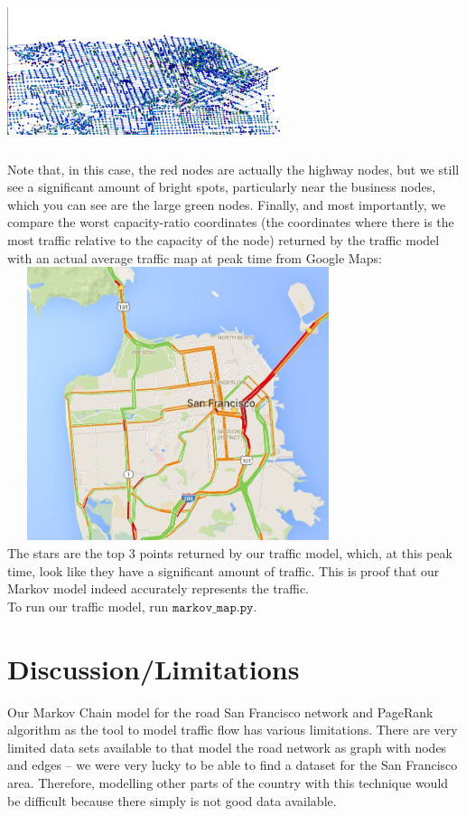 \documentclass{article}
\begin{document}
 \includegraphics[width=8cm,height=5cm]{../figs/f3} \\
Note that, in this case, the red nodes are actually the highway nodes, but we still see a significant amount of bright spots, particularly near the business nodes, which you can see are the large green nodes.
Finally, and most importantly, we compare the worst capacity-ratio coordinates (the coordinates where there is the most traffic relative to the capacity of the node) returned by the traffic model with an actual average traffic map at peak time from Google Maps: \\
 \includegraphics[width=10cm,height=8cm]{../figs/fkey} \\
 The stars are the top 3 points returned by our traffic model, which, at this peak time, look like they have a significant amount of traffic. This is proof that our Markov model indeed accurately represents the traffic. \\
 To run our traffic model, run $\texttt{markov\_map.py}$.
\section{Discussion/Limitations}
Our Markov Chain model for the road San Francisco network and PageRank algorithm as the tool to model traffic flow has various limitations. There are very limited data sets available to that model the road network as graph with nodes and edges – we were very lucky to be able to find a dataset for the San Francisco area.  Therefore, modelling other parts of the country with this technique would be difficult because there simply is not good data available. 
\end{document}
